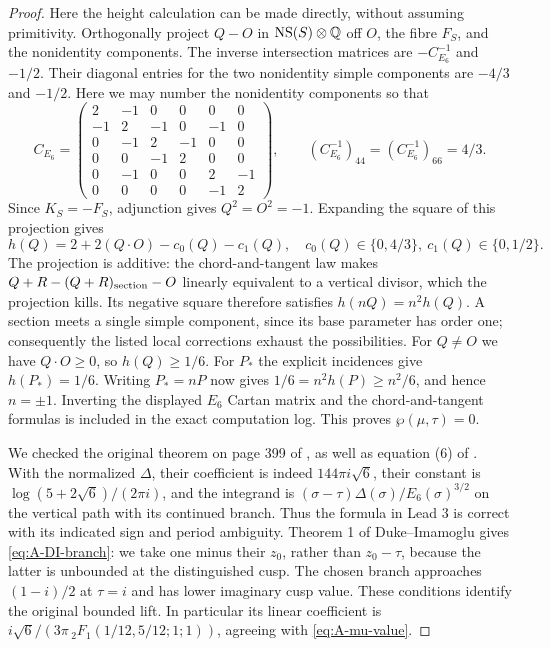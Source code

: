 \begin{proof}
Here the height calculation can be made directly, without assuming
primitivity.  Orthogonally project $Q-O$ in
$\operatorname{NS}(S)\otimes\mathbb Q$ off $O$, the fibre $F_S$, and the
nonidentity components.  The inverse intersection matrices are
$-C_{E_6}^{-1}$ and $-1/2$.  Their diagonal entries for the two
nonidentity simple components are $-4/3$ and $-1/2$.
Here we may number the nonidentity components so that
\[
C_{E_6}=\begin{pmatrix}
2&-1&0&0&0&0\\
-1&2&-1&0&-1&0\\
0&-1&2&-1&0&0\\
0&0&-1&2&0&0\\
0&-1&0&0&2&-1\\
0&0&0&0&-1&2
\end{pmatrix},\qquad
(C_{E_6}^{-1})_{44}=(C_{E_6}^{-1})_{66}=4/3.
\]
Since $K_S=-F_S$, adjunction gives $Q^2=O^2=-1$.  Expanding the
square of this projection gives
\[
h(Q)=2+2(Q\cdot O)-c_0(Q)-c_1(Q),\quad
c_0(Q)\in\{0,4/3\},\ c_1(Q)\in\{0,1/2\}.
\]
The projection is additive: the chord-and-tangent law makes
$Q+R-(Q+R)_{\rm section}-O$ linearly equivalent to a vertical
divisor, which the projection kills.  Its negative square therefore
satisfies $h(nQ)=n^2h(Q)$.  A section meets a single simple
component, since its base parameter has order one; consequently
the listed local corrections exhaust the possibilities.
For $Q\ne O$ we have $Q\cdot O\ge0$, so $h(Q)\ge1/6$.
For $P_*$ the explicit incidences give $h(P_*)=1/6$.
Writing $P_*=nP$ now gives $1/6=n^2h(P)\ge n^2/6$, and hence
$n=\pm1$.  Inverting the displayed $E_6$ Cartan matrix and the
chord-and-tangent formulas is included in the exact computation log.
This proves $\wp(\mu,\tau)=0$.

We checked the original theorem on page 399 of
\citet{EichlerZagier1982}, as well as equation (6) of
\citet{DukeImamoglu2008}.  With the normalized $\Delta$, their
coefficient is indeed $144\pi i\sqrt6$, their constant is
$\log(5+2\sqrt6)/(2\pi i)$, and the integrand is
$(\sigma-\tau)\Delta(\sigma)/E_6(\sigma)^{3/2}$ on the vertical
path with its continued branch.  Thus the formula in Lead 3 is
correct with its indicated sign and period ambiguity.  Theorem 1
of Duke--Imamoglu gives \eqref{eq:A-DI-branch}: we take one minus
their $z_0$, rather than $z_0-\tau$, because the latter is unbounded
at the distinguished cusp.  The chosen branch approaches
$(1-i)/2$ at $\tau=i$ and has lower imaginary cusp value.
These conditions identify the original bounded lift.  In particular
its linear coefficient is
$i\sqrt6/(3\pi\,{}_2F_1(1/12,5/12;1;1))$, agreeing with
\eqref{eq:A-mu-value}.


\end{proof}
